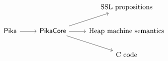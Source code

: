 \[\begin{tikzcd}
	&& {\textnormal{SSL propositions}} \\
	{\Pika} & {\PikaCore} & {\textnormal{Heap machine semantics}} \\
	&& {\textnormal{C code}}
	\arrow[from=2-1, to=2-2]
	\arrow[from=2-2, to=1-3]
	\arrow[from=2-2, to=2-3]
	\arrow[from=2-2, to=3-3]
\end{tikzcd}\]
